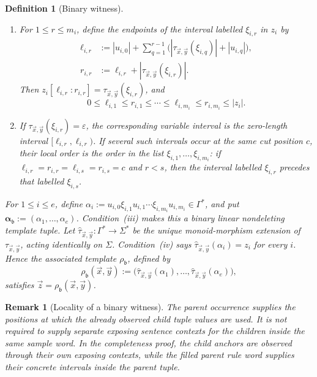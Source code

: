\documentclass[11pt,a4paper]{article}
\newtheorem{definition}[theorem]{Definition}
\newtheorem{remark}[theorem]{Remark}
\theoremstyle{remark}
\newcommand{\tuple}[1]{\vec{#1}}
\newcommand{\eps}{\varepsilon}
\begin{document}
\begin{definition}[Binary witness]
\begin{enumerate}[label=(\roman*),leftmargin=*]
\item For \(1\le r\le m_i\), define the endpoints of the interval labelled
      \(\xi_{i,r}\) in \(z_i\) by
      \[
      \begin{aligned}
        \ell_{i,r}
        &:={}|u_{i,0}|+\sum_{q=1}^{r-1}
        \bigl(|\tau_{\tuple x,\tuple y}(\xi_{i,q})|+|u_{i,q}|\bigr),\\
        r_{i,r}
        &:={\ell_{i,r}}+|\tau_{\tuple x,\tuple y}(\xi_{i,r})|.
      \end{aligned}
      \]
      Then \(z_i[\ell_{i,r}:r_{i,r}]
      =\tau_{\tuple x,\tuple y}(\xi_{i,r})\), and
      \[
        0\le\ell_{i,1}\le r_{i,1}\le\cdots\le
        \ell_{i,m_i}\le r_{i,m_i}\le|z_i|.
      \]

\item If \(\tau_{\tuple x,\tuple y}(\xi_{i,r})=\eps\), the corresponding
      variable interval is the zero-length interval
      \([\ell_{i,r},\ell_{i,r})\).  If several such intervals occur at the
      same cut position \(c\), their local order is the order in the list
      \(\xi_{i,1},\ldots,\xi_{i,m_i}\): if
      \(\ell_{i,r}=r_{i,r}=\ell_{i,s}=r_{i,s}=c\) and \(r<s\), then the
      interval labelled \(\xi_{i,r}\) precedes that labelled \(\xi_{i,s}\).
\end{enumerate}

For \(1\le i\le e\), define
\(\alpha_i:=u_{i,0}\xi_{i,1}u_{i,1}\cdots
\xi_{i,m_i}u_{i,m_i}\in\Gamma^*\), and put
\(\boldsymbol\alpha_{\mathfrak b}:=(\alpha_1,\ldots,\alpha_e)\).
Condition~(iii) makes this a binary linear nondeleting template tuple.
Let \(\widehat\tau_{\tuple x,\tuple y}:\Gamma^*\to\Sigma^*\) be the unique
monoid-morphism extension of \(\tau_{\tuple x,\tuple y}\), acting identically
on \(\Sigma\).  Condition~(iv) says
\(\widehat\tau_{\tuple x,\tuple y}(\alpha_i)=z_i\) for every \(i\).  Hence the
associated template \(\rho_{\mathfrak b}\), defined by
\[
  \rho_{\mathfrak b}(\tuple x,\tuple y):=
  \bigl(\widehat\tau_{\tuple x,\tuple y}(\alpha_1),\ldots,
        \widehat\tau_{\tuple x,\tuple y}(\alpha_e)\bigr),
\]
satisfies \(\tuple z=\rho_{\mathfrak b}(\tuple x,\tuple y)\).
\end{definition}

\begin{remark}[Locality of a binary witness]
\label{rem:binary-witness-locality}
The parent occurrence supplies the positions at which the already observed
child tuple values are used.  It is not required to supply separate exposing
sentence contexts for the children inside the same sample word.  In the
completeness proof, the child anchors are observed through their own exposing
contexts, while the filled parent rule word supplies their concrete intervals
inside the parent tuple.
\end{remark}
\end{document}
